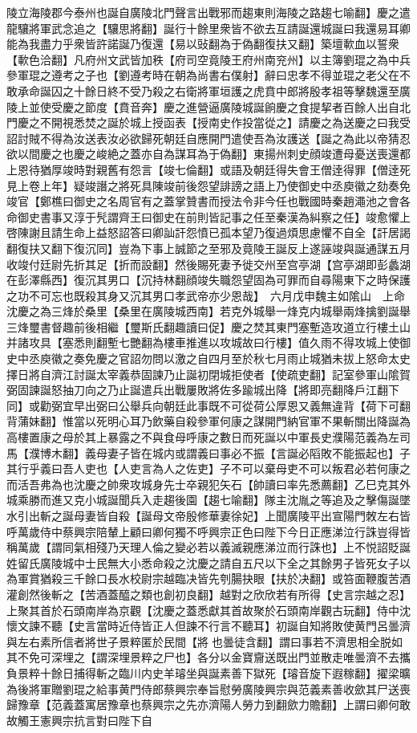 陵立海陵郡今泰州也誕自廣陵北門聲言出戰邪而趨東則海陵之路趨七喻翻】慶之遣龍驤將軍武念追之【驤思將翻】誕行十餘里衆皆不欲去互請誕還城誕曰我還易耳卿能為我盡力乎衆皆許諾誕乃復還【易以䜴翻為于偽翻復扶又翻】築壇㰱血以誓衆【㰱色洽翻】凡府州文武皆加秩【府司空竟陵王府州南兖州】以主簿劉琨之為中兵參軍琨之遵考之子也【劉遵考時在朝為尚書右僕射】辭曰忠孝不得並琨之老父在不敢承命誕囚之十餘日終不受乃殺之右衛將軍垣護之虎賁中郎將殷孝祖等擊魏還至廣陵上並使受慶之節度【賁音奔】慶之進營逼廣陵城誕餉慶之食提挈者百餘人出自北門慶之不開視悉焚之誕於城上授函表【授南史作投當從之】請慶之為送慶之曰我受詔討賊不得為汝送表汝必欲歸死朝廷自應開門遣使吾為汝護送【誕之為此以帝猜忍欲以間慶之也慶之峻絶之蓋亦自為謀耳為于偽翻】東揚州刺史顔竣遭母憂送喪還都上恩待猶厚竣時對親舊有怨言【竣七倫翻】或語及朝廷得失會王僧逹得罪【僧逹死見上卷上年】疑竣譖之將死具陳竣前後怨望誹謗之語上乃使御史中丞庾徽之劾奏免竣官【鄭樵曰御史之名周官有之蓋掌贊書而授法令非今任也戰國時秦趙澠池之會各命御史書事又淳于髠謂齊王曰御史在前則皆記事之任至秦漢為糾察之任】竣愈懼上啓陳謝且請生命上益怒詔答曰卿訕訐怨憤已孤本望乃復過煩思慮懼不自全【訐居謁翻復扶又翻下復沉同】豈為下事上誠節之至邪及竟陵王誕反上遂誣竣與誕通謀五月收竣付廷尉先折其足【折而設翻】然後賜死妻予徙交州至宫亭湖【宫亭湖即彭蠡湖在彭澤縣西】復沉其男口【沉持林翻顔竣失職怨望固為可罪而自尋陽東下之時保護之功不可忘也既殺其身又沉其男口孝武帝亦少恩哉】　六月戊申魏主如隂山　上命沈慶之為三烽於桑里【桑里在廣陵城西南】若克外城舉一烽克内城舉兩烽擒劉誕舉三烽璽書督趣前後相繼【璽斯氏翻趣讀曰促】慶之焚其東門塞塹造攻道立行樓土山并諸攻具【塞悉則翻塹七艷翻為樓車推進以攻城故曰行樓】值久雨不得攻城上使御史中丞庾徽之奏免慶之官詔勿問以激之自四月至於秋七月雨止城猶未拔上怒命太史擇日將自濟江討誕太宰義恭固諫乃止誕初閉城拒使者【使疏吏翻】記室參軍山隂賀弼固諫誕怒抽刀向之乃止誕遣兵出戰屢敗將佐多踰城出降【將即亮翻降戶江翻下同】或勸弼宜早出弼曰公舉兵向朝廷此事既不可從荷公厚恩又義無違背【荷下可翻背蒲妹翻】惟當以死明心耳乃飲藥自殺參軍何康之謀開門納官軍不果斬關出降誕為高樓置康之母於其上暴露之不與食母呼康之數日而死誕以中軍長史濮陽范義為左司馬【濮博木翻】義母妻子皆在城内或謂義曰事必不振【言誕必䧟敗不能振起也】子其行乎義曰吾人吏也【人吏言為人之佐吏】子不可以棄母吏不可以叛君必若何康之而活吾弗為也沈慶之帥衆攻城身先士卒親犯矢石【帥讀曰率先悉薦翻】乙巳克其外城乘勝而進又克小城誕聞兵入走趨後園【趨七喻翻】隊主沈胤之等追及之擊傷誕墜水引出斬之誕母妻皆自殺【誕母文帝殷修華妻徐妃】上聞廣陵平出宣陽門敇左右皆呼萬歲侍中蔡興宗陪輦上顧曰卿何獨不呼興宗正色曰陛下今日正應涕泣行誅豈得皆稱萬歲【謂同氣相殘乃天理人倫之變必若以義滅親應涕泣而行誅也】上不悦詔貶誕姓留氏廣陵城中士民無大小悉命殺之沈慶之請自五尺以下全之其餘男子皆死女子以為軍賞猶殺三千餘口長水校尉宗越臨决皆先刳腸抉眼【扶於决翻】或笞面鞭腹苦酒灌創然後斬之【苦酒蓋醯之類也創初良翻】越對之欣欣若有所得【史言宗越之忍】上聚其首於石頭南岸為京觀【沈慶之蓋悉獻其首故聚於石頭南岸觀古玩翻】侍中沈懷文諫不聽【史言當時近侍皆正人但諫不行言不聽耳】初誕自知將敗使黄門呂曇濟與左右素所信者將世子景粹匿於民間【將也曇徒含翻】謂曰事若不濟思相全脱如其不免可深埋之【謂深埋景粹之尸也】各分以金寶齎送既出門並散走唯曇濟不去攜負景粹十餘日捕得斬之臨川内史羊璿坐與誕素善下獄死【璿音旋下遐稼翻】擢梁曠為後將軍贈劉琨之給事黄門侍郎蔡興宗奉旨慰勞廣陵興宗與范義素善收歛其尸送喪歸豫章【范義蓋寓居豫章也蔡興宗之先亦濟陽人勞力到翻歛力贍翻】上謂曰卿何敢故觸王憲興宗抗言對曰陛下自